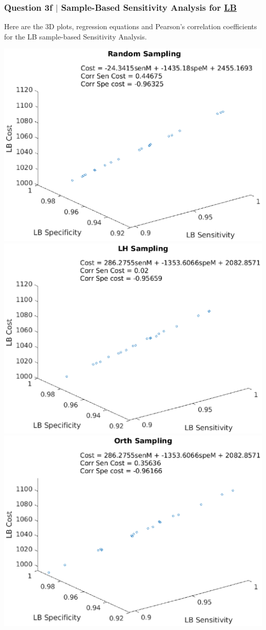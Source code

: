 \documentclass[aspectratio=1610]{beamer}
\begin{document}
\begin{frame}
\frametitle{Question 3f $|$ Sample-Based Sensitivity Analysis for \underline{LB}}
Here are the 3D plots, regression equations and Pearson's correlation coefficients for the LB sample-based Sensitivity Analysis. 

\vspace{1em}
\centering                                                         
\includegraphics[scale = .3]{lb1}
\includegraphics[scale = .3]{lb2}
\includegraphics[scale = .3]{lb3}\\

\end{frame}
\end{document}
